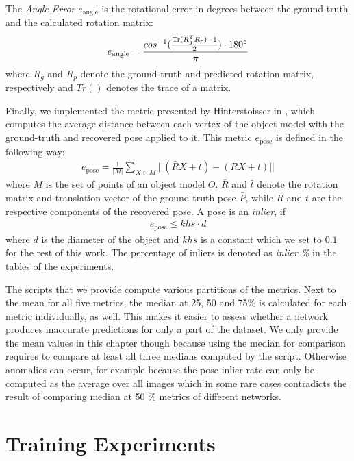 The \textit{Angle Error} $e_{\text{angle}}$ is the rotational error in degrees between the ground-truth and the calculated rotation matrix:
\begin{align*}
e_{\text{angle}} = \frac{cos^{-1}(\frac{\operatorname{Tr}(R_g^TR_p) - 1}{2}) \cdot 180\degree}{\pi}
\end{align*}
where $R_g$ and $R_p$ denote the ground-truth and predicted rotation matrix, respectively and $Tr()$ denotes the trace of a matrix.

Finally, we implemented the metric presented by Hinterstoisser \etal in \cite{hinterstoisser2}, which computes the average distance between each vertex of the object model with the ground-truth and recovered pose applied to it. This metric $e_{\text{pose}}$ is defined in the following way:
\begin{align*}
e_{\text{pose}} = \frac{1}{|M|} \sum\limits_{X \in M}||(\bar{R}X + \bar{t}) - (RX + t)||
\end{align*}
where $M$ is the set of points of an object model $O$. $\bar{R}$ and $\bar{t}$ denote the rotation matrix and translation vector of the ground-truth pose $\bar{P}$, while $R$ and $t$ are the respective components of the recovered pose. A pose is an \textit{inlier}, if
\begin{align*}
e_{\text{pose}} \leq khs \cdot d
\end{align*}
where $d$ is the diameter of the object and $khs$ is a constant which we set to $0.1$ for the rest of this work. The percentage of inliers is denoted as \textit{inlier \%} in the tables of the experiments.

The scripts that we provide compute various partitions of the metrics. Next to the mean for all five metrics, the median at 25, 50 and 75\% is calculated for each metric individually, as well. This makes it easier to assess whether a network produces inaccurate predictions for only a part of the dataset. We only provide the mean values in this chapter though because using the median for comparison requires to compare at least all three medians computed by the script. Otherwise anomalies can occur, for example because the pose inlier rate can only be computed as the average over all images which in some rare cases contradicts the result of comparing median at 50 \% metrics of different networks.

\section{Training Experiments}

